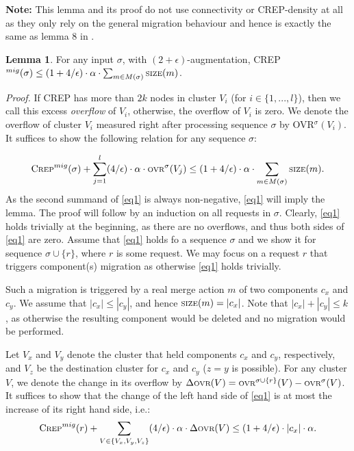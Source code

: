 \documentclass[xcolor=dvipsnames, tikz, 12pt]{article}
\newcommand{\crep}{C{\scriptsize REP}}
\newcommand{\size}{\text{\scriptsize SIZE}}
\newcommand{\ovr}{\text{\scriptsize OVR}}
\theoremstyle{definition}
\newtheorem{lemma}[defi]{Lemma}
\begin{document}
\textbf{Note:} This lemma and its proof do not use connectivity or \crep{}-density at all as they only rely on the general migration behaviour and hence is exactly the same as lemma 8 in \cite{Avin2015}.
\begin{lemma}
	For any input $\sigma$, with $(2+\epsilon)$-augmentation, \crep{}$^{mig}(\sigma)\leq(1+4/\epsilon)\cdot\alpha\cdot\sum_{m\in M(\sigma)}\size(m)$.
\end{lemma}

\textit{Proof.} If \crep{} has more than $2k$ nodes in cluster $V_i$ (for $i\in\{1,...,l\}$), then we call this excess \textit{overflow} of $V_i$, otherwise, the overflow of $V_i$ is zero. We denote the overflow of cluster $V_i$ measured right after processing sequence $\sigma$ by OVR$^\sigma(V_i)$. It suffices to show the following relation for any sequence $\sigma$:

\begin{align}
\text{\crep{}}^{mig}(\sigma)+\displaystyle\sum_{j=1}^l(4/\epsilon)\cdot\alpha\cdot\ovr^\sigma(V_j)\leq(1+4/\epsilon)\cdot\alpha\cdot\sum_{m\in M(\sigma)}\size(m).\label{eq1}
\end{align}
As the second summand of \ref{eq1} is always non-negative, \ref{eq1} will imply the lemma.
The proof will follow by an induction on all requests in $\sigma$. Clearly, \ref{eq1} holds trivially at the beginning, as there are no overflows, and thus both sides of \ref{eq1} are zero.
Assume that \ref{eq1} holds fo a sequence $\sigma$ and we show it for sequence $\sigma\cup\{r\}$, where $r$ is some request.
We may focus on a request $r$ that triggers component(s) migration as otherwise \ref{eq1} holds trivially.

Such a migration is triggered by a real merge action $m$ of two components $c_x$ and $c_y$. We assume that $|c_x|\leq|c_y|$, and hence $\size(m)=|c_x|$. Note that $|c_x|+|c_y|\leq k$, as otherwise the resulting component would be deleted and no migration would be performed.

Let $V_x$ and $V_y$ denote the cluster that held components $c_x$ and $c_y$, respectively, and $V_z$ be the destination cluster for $c_x$ and $c_y$ ($z=y$ is possible). For any cluster $V$, we denote the change in its overflow by $\Delta\ovr(V)=\ovr^{\sigma\cup\{r\}}(V)-\ovr{}^{\sigma}(V)$. It suffices to show that the change of the left hand side of \ref{eq1} is at most the increase of its right hand side, i.e.:
\begin{align}
\text{\crep{}}^{mig}(r)+\displaystyle\sum_{V\in\{V_x, V_y, V_z\}}(4/\epsilon)\cdot\alpha\cdot\Delta\ovr{}(V)\leq(1+4/\epsilon)\cdot|c_x|\cdot\alpha.\label{eq2}
\end{align}
\end{document}
